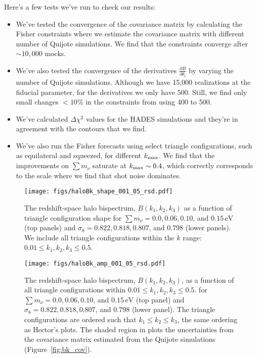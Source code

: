 \documentclass[12pt, letterpaper, preprint]{aastex62}
\newcommand{\smnu}{\sum m_\nu}
\newcommand{\sig}{\sigma_8}
\begin{document}
Here's a few tests we've run to check our results:
\begin{itemize} 
    \item We've tested the convergence of the covariance matrix by calculating the 
        Fisher constraints where we estimate the covariance matrix with different 
        number of Quijote simulations. We find that the constraints converge after 
        $\sim 10,000$ mocks. 
    \item We've also tested the convergence of the derivatives $\frac{\partial B}{\partial \theta_i}$ 
        by varying the number of Quijote simulations. Although we have 15,000 realizations
        at the fiducial parameter, for the derivatives we only have 500. Still, we find 
        only small changes $ < 10\%$ in the constraints from using 400 to 500. 
    \item We've calculated $\Delta\chi^2$ values for the HADES simulations and 
        they're in agreement with the contours that we find.  
    \item We've also run the Fisher forecasts using select triangle configurations,
        such as equilateral and squeezed, for different $k_{\rm max}$. We find that 
        the improvements on $\smnu$ saturate at $k_{\rm max} \sim 0.4$, which 
        correctly corresponds to the scale where we find that shot noise dominates. 
\end{itemize}

\begin{figure}
\begin{center}
    \texttt{[image: figs/haloBk\_shape\_001\_05\_rsd.pdf]} 
    \caption{The redshift-space halo bispectrum, $B(k_1, k_2, k_3)$ as a 
    function of triangle configuration shape for $\smnu = 0.0, 0.06, 0.10$, 
    and $0.15\,\mathrm{eV}$ (top panels) and $\sig = 0.822, 0.818, 0.807$, 
    and $0.798$ (lower panels). We include all triangle configurations within
    the $k$ range: $0.01 \leq k_1, k_2, k_3 \leq 0.5$.}
\label{fig:bk_shape}
\end{center}
\end{figure}

\begin{figure}
\begin{center}
\texttt{[image: figs/haloBk\_amp\_001\_05\_rsd.pdf]}
    \caption{The redshift-space halo bispectrum, $B(k_1, k_2, k_3)$, as a
    function of all triangle configurations within $0.01 \leq k_1, k_2, k_3 \leq 0.5$.
    for $\smnu = 0.0, 0.06, 0.10$, and $0.15\,\mathrm{eV}$ (top panel) and 
    $\sig = 0.822, 0.818, 0.807$, and $0.798$ (lower panel). The triangle
    configurations are ordered such that $k_1 \leq k_2 \leq k_3$, the same 
    ordering as Hector's plots. The shaded region in plots the uncertainties 
    from the covariance matrix estimated from the Quijote simulations 
    (Figure~\ref{fig:bk_cov}).}
\label{fig:bk_amp}
\end{center}
\end{figure}
\end{document}
